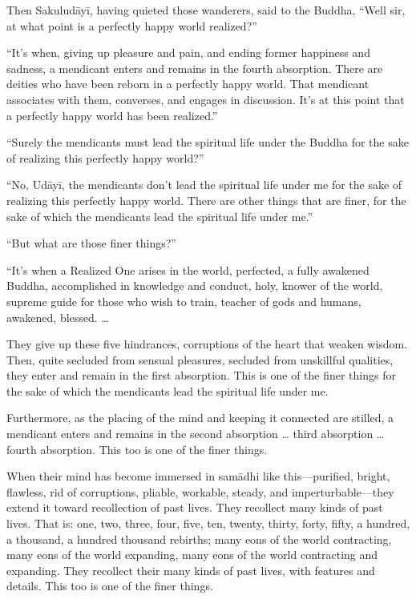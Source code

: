 \documentclass[12pt,openany]{book}%
\begin{document}
Then \textsanskrit{Sakuludāyī}, having quieted those wanderers, said to the Buddha, “Well sir, at what point is a perfectly happy world realized?” 

“It’s when, giving up pleasure and pain, and ending former happiness and sadness, a mendicant enters and remains in the fourth absorption. There are deities who have been reborn in a perfectly happy world. That mendicant associates with them, converses, and engages in discussion. It’s at this point that a perfectly happy world has been realized.” 

“Surely the mendicants must lead the spiritual life under the Buddha for the sake of realizing this perfectly happy world?” 

“No, \textsanskrit{Udāyī}, the mendicants don’t lead the spiritual life under me for the sake of realizing this perfectly happy world. There are other things that are finer, for the sake of which the mendicants lead the spiritual life under me.” 

“But what are those finer things?” 

“It’s when a Realized One arises in the world, perfected, a fully awakened Buddha, accomplished in knowledge and conduct, holy, knower of the world, supreme guide for those who wish to train, teacher of gods and humans, awakened, blessed. … 

They give up these five hindrances, corruptions of the heart that weaken wisdom. Then, quite secluded from sensual pleasures, secluded from unskillful qualities, they enter and remain in the first absorption. This is one of the finer things for the sake of which the mendicants lead the spiritual life under me. 

Furthermore, as the placing of the mind and keeping it connected are stilled, a mendicant enters and remains in the second absorption … third absorption … fourth absorption. This too is one of the finer things. 

When their mind has become immersed in \textsanskrit{samādhi} like this—purified, bright, flawless, rid of corruptions, pliable, workable, steady, and imperturbable—they extend it toward recollection of past lives. They recollect many kinds of past lives. That is: one, two, three, four, five, ten, twenty, thirty, forty, fifty, a hundred, a thousand, a hundred thousand rebirths; many eons of the world contracting, many eons of the world expanding, many eons of the world contracting and expanding. They recollect their many kinds of past lives, with features and details. This too is one of the finer things. 
\end{document}
